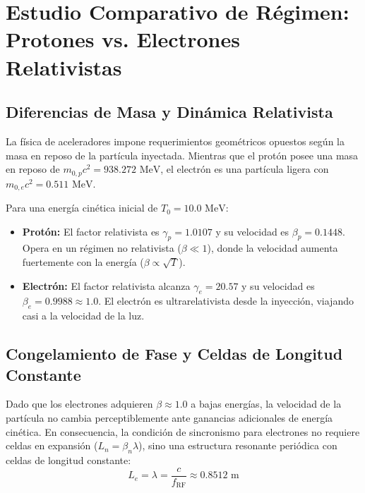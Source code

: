 \chapter{Estudio Comparativo de Régimen: Protones vs. Electrones Relativistas}

\section{Diferencias de Masa y Dinámica Relativista}
La física de aceleradores impone requerimientos geométricos opuestos según la masa en reposo de la partícula inyectada. Mientras que el protón posee una masa en reposo de $m_{0,p}c^2 = 938.272\text{ MeV}$, el electrón es una partícula ligera con $m_{0,e}c^2 = 0.511\text{ MeV}$.

Para una energía cinética inicial de $T_0 = 10.0\text{ MeV}$:
\begin{itemize}
    \item \textbf{Protón:} El factor relativista es $\gamma_p = 1.0107$ y su velocidad es $\beta_p = 0.1448$. Opera en un régimen no relativista ($\beta \ll 1$), donde la velocidad aumenta fuertemente con la energía ($\beta \propto \sqrt{T}$).
    \item \textbf{Electrón:} El factor relativista alcanza $\gamma_e = 20.57$ y su velocidad es $\beta_e = 0.9988 \approx 1.0$. El electrón es ultrarelativista desde la inyección, viajando casi a la velocidad de la luz.
\end{itemize}

\section{Congelamiento de Fase y Celdas de Longitud Constante}
Dado que los electrones adquieren $\beta \approx 1.0$ a bajas energías, la velocidad de la partícula no cambia perceptiblemente ante ganancias adicionales de energía cinética. En consecuencia, la condición de sincronismo para electrones no requiere celdas en expansión ($L_n = \beta_n \lambda$), sino una estructura resonante periódica con celdas de longitud constante:
\begin{equation}
L_e = \lambda = \frac{c}{f_{\text{RF}}} \approx 0.8512\text{ m}
\end{equation}


